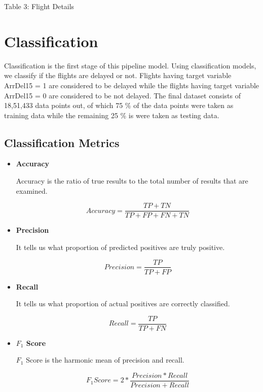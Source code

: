 \documentclass[12pt,letterpaper]{article}
\begin{document}
        \begin{center}
            Table 3: Flight Details
        \end{center}

\section{Classification}
    
    Classification is the first stage of this pipeline model. Using classification models, we classify if the flights are delayed or not. Flights having target variable ArrDel15 = 1 are considered to be delayed while the flights having target variable ArrDel15 = 0 are considered to be not delayed. The final dataset consists of 18,51,433 data points out, of which 75 \% of the data points were taken as training data while the remaining 25 \% is were taken as testing data.

     \subsection*{Classification Metrics}
    
        \begin{itemize}
        
            \item\textbf{Accuracy}
            
                 Accuracy is the ratio of true results to the total number of results that are examined.
             
                \[Accuracy = \frac{TP + TN }{TP + FP + FN + TN}\]
                
            
            \item\textbf{Precision}
            
                It tells us what proportion of predicted positives are truly positive.
            
                \[Precision = \frac{TP}{TP + FP}\]
            
            \item\textbf{Recall}
            
                It tells us what proportion of actual positives are correctly classified.
            
                \[Recall = \frac{TP}{TP + FN}\]
            
            \item\textbf{$F_1$ Score}
            
                $F_1$ Score is the harmonic mean of precision and recall.
            
                \[F_1 Score = 2 * \frac{Precision * Recall}{Precision + Recall}\]
            
        \end{itemize}
\end{document}
